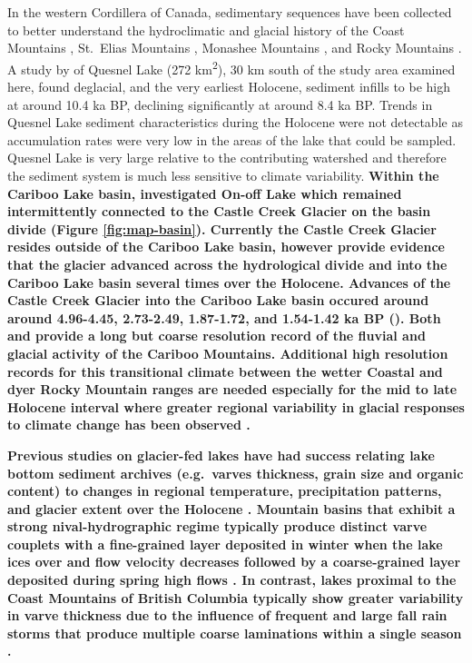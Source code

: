 \documentclass[Royal,times,doublespace,sageh]{sagej}
\begin{document}
In the western Cordillera of Canada, sedimentary sequences have been
collected to better understand the hydroclimatic and glacial history of
the Coast Mountains \citep{Menounos2008c}, St.~Elias Mountains
\citep{Crookshanks2008}, Monashee Mountains \citep{Hodder2006b}, and
Rocky Mountains \citep{Leonard1986, Dirszowsky1997a, Desloges1999}. A
study by \citet{Gilbert2012} of Quesnel Lake (272
km\textsuperscript{2}), 30 km south of the study area examined here,
found deglacial, and the very earliest Holocene, sediment infills to be
high at around 10.4 ka BP, declining significantly at around 8.4 ka BP.
Trends in Quesnel Lake sediment characteristics during the Holocene were
not detectable as accumulation rates were very low in the areas of the
lake that could be sampled. Quesnel Lake is very large relative to the
contributing watershed and therefore the sediment system is much less
sensitive to climate variability. \textbf{Within the Cariboo Lake basin,
\citet{Maurer2012b} investigated On-off Lake which remained
intermittently connected to the Castle Creek Glacier on the basin divide
(Figure \ref{fig:map-basin}). Currently the Castle Creek Glacier resides
outside of the Cariboo Lake basin, however \citet{Maurer2012b} provide
evidence that the glacier advanced across the hydrological divide and
into the Cariboo Lake basin several times over the Holocene. Advances of
the Castle Creek Glacier into the Cariboo Lake basin occured around
around 4.96-4.45, 2.73-2.49, 1.87-1.72, and 1.54-1.42 ka BP
(\citet{Maurer2012b}). Both \citet{Gilbert2012} and \citet{Maurer2012b}
provide a long but coarse resolution record of the fluvial and glacial
activity of the Cariboo Mountains. Additional high resolution records
for this transitional climate between the wetter Coastal and dyer Rocky
Mountain ranges are needed especially for the mid to late Holocene
interval where greater regional variability in glacial responses to
climate change has been observed \citep{Steinman2019, Menounos2009b}.}

\textbf{Previous studies on glacier-fed lakes have had success relating
lake bottom sediment archives (e.g.~varves thickness, grain size and
organic content) to changes in regional temperature, precipitation
patterns, and glacier extent over the Holocene
\citep{Desloges1999, Hodder2006b, Leonard1997, Menounos2006b, Menounos2008c}.
Mountain basins that exhibit a strong nival-hydrographic regime
typically produce distinct varve couplets with a fine-grained layer
deposited in winter when the lake ices over and flow velocity decreases
followed by a coarse-grained layer deposited during spring high flows
\citep[e.g.][]{Leonard1997, Hodder2007c, Desloges1999}. In contrast,
lakes proximal to the Coast Mountains of British Columbia typically show
greater variability in varve thickness due to the influence of frequent
and large fall rain storms that produce multiple coarse laminations
within a single season \citep[e.g.][]{Gilbert1997, Menounos2008c}.}
\end{document}

